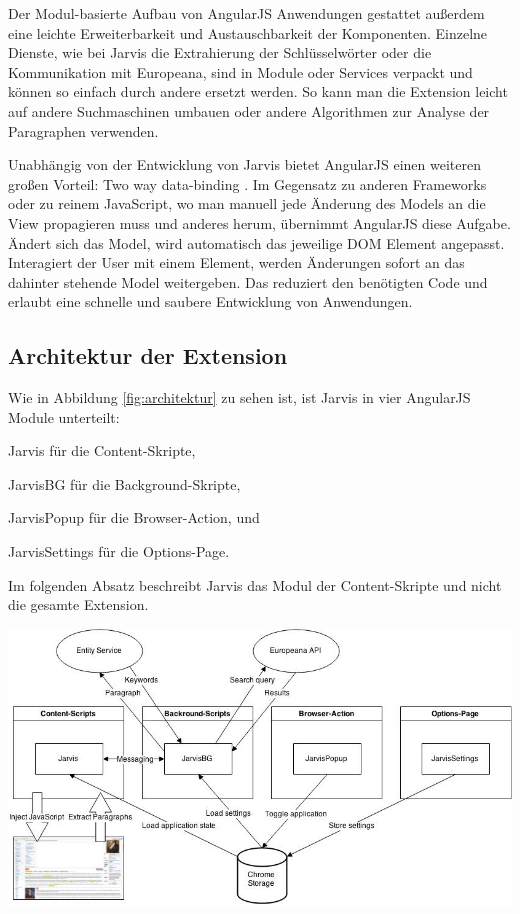  Der Modul-basierte Aufbau von AngularJS Anwendungen gestattet außerdem eine leichte Erweiterbarkeit und Austauschbarkeit der Komponenten. Einzelne Dienste, wie bei Jarvis die Extrahierung der Schlüsselwörter oder die Kommunikation mit Europeana, sind in Module oder Services verpackt und können so einfach durch andere ersetzt werden. So kann man die Extension leicht auf andere Suchmaschinen umbauen oder andere Algorithmen zur Analyse der Paragraphen verwenden.

 Unabhängig von der Entwicklung von Jarvis bietet AngularJS einen weiteren großen Vorteil: Two way data-binding \cite{jain2015angularjs}. Im Gegensatz zu anderen Frameworks oder zu reinem JavaScript, wo man manuell jede Änderung des Models an die View propagieren muss und anderes herum, übernimmt AngularJS diese Aufgabe. Ändert sich das Model, wird automatisch das jeweilige DOM Element angepasst. Interagiert der User mit einem Element, werden Änderungen sofort an das dahinter stehende Model weitergeben. Das reduziert den benötigten Code und erlaubt eine schnelle und saubere Entwicklung von Anwendungen.

 \subsection{Architektur der Extension}
 Wie in Abbildung \ref{fig:architektur} zu sehen ist, ist Jarvis in vier AngularJS Module unterteilt:
 \begin{enumerate*}[label=\alph*\upshape)]
 	\item Jarvis für die Content-Skripte,
  	\item JarvisBG für die Background-Skripte,
 	\item JarvisPopup für die Browser-Action, und
 	\item JarvisSettings für die Options-Page.
 \end{enumerate*}
 Im folgenden Absatz beschreibt Jarvis das Modul der Content-Skripte und nicht die gesamte Extension.

 \begin{minipage}{\linewidth}
	\centering
	\vspace*{0.5cm}
	\includegraphics[width=\linewidth]{Bilder/architektur.jpg}
	\label{fig:architektur}
	\vspace*{0.5cm}
 \end{minipage}
 
